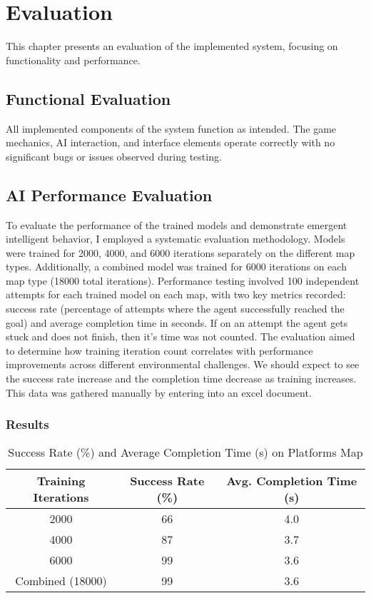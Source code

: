 \chapter{Evaluation}

This chapter presents an evaluation of the implemented system, focusing on functionality and performance.

\section{Functional Evaluation}
All implemented components of the system function as intended. The game mechanics, AI interaction, and interface elements operate correctly with no significant bugs or issues observed during testing.

\section{AI Performance Evaluation}
To evaluate the performance of the trained models and demonstrate emergent intelligent behavior, I employed a systematic evaluation methodology. Models were trained for 2000, 4000, and 6000 iterations separately on the different map types. 
Additionally, a combined model was trained for 6000 iterations on each map type (18000 total iterations).
Performance testing involved 100 independent attempts for each trained model on each map, with two key metrics recorded: success rate (percentage of attempts where the agent successfully reached the goal) and average completion time in seconds.
If on an attempt the agent gets stuck and does not finish, then it's time was not counted.
The evaluation aimed to determine how training iteration count correlates with performance improvements across different environmental challenges. 
We should expect to see the success rate increase and the completion time decrease as training increases.
This data was gathered manually by entering into an excel document.

\subsection{Results}

\begin{table}[H]
\centering
\caption{Success Rate (\%) and Average Completion Time (s) on Platforms Map}
\begin{tabular}{|c|c|c|}
\hline
\textbf{Training Iterations} & \textbf{Success Rate (\%)} & \textbf{Avg. Completion Time (s)} \\
\hline
2000 & 66 & 4.0 \\
\hline
4000 & 87 & 3.7 \\
\hline
6000 & 99 & 3.6 \\
\hline
Combined (18000) & 99 & 3.6 \\
\hline
\end{tabular}
\end{table}

